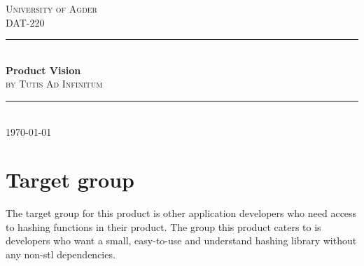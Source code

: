 \documentclass[12pt]{article}
\begin{document}
\begin{titlepage}

\newcommand{\HRule}{\rule{\linewidth}{0.5mm}} %
\center %
 
 
\textsc{\LARGE University of Agder}\\[1.5cm]
\textsc{\Large DAT-220}\\[0.5cm]

\vspace{25 mm}
\HRule \\[0.4cm]
{ \huge \bfseries Product Vision}\\[0.4cm]
\textsc{\Large by Tutis Ad Infinitum}\\[0.5cm]
\HRule \\[1.5cm]
 
 
 
\vspace{100 mm}
{\large \today}\\[3cm]
\vfill
\end{titlepage}



\pagestyle{fancy}
\setcounter{secnumdepth}{5}


\newpage

\section*{Target group}
The target group for this product is other application developers who need access to hashing functions in their product. The group this product caters to is developers who want a small, easy-to-use and understand hashing library without any non-stl dependencies.
\end{document}
